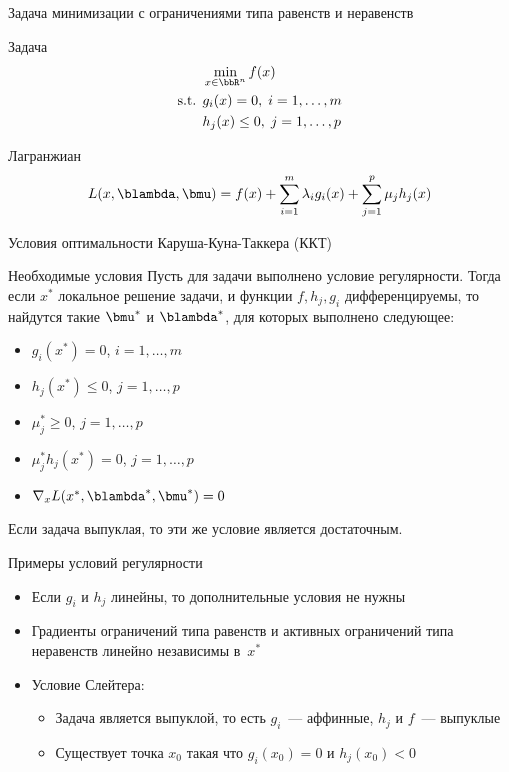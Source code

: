 \documentclass[12pt]{beamer}
\begin{document}
\begin{frame}{{\small Задача минимизации с ограничениями типа равенств и неравенств}}

\begin{block}{Задача}
\vspace{-5mm}
\begin{equation*}
\begin{split}
& \min\limits_{x \in \bbR^n} f(x)\\
\text{s.t. } & g_i(x) = 0, \; i = 1,\ldots,m\\
& h_j(x) \leq 0, \; j = 1,\ldots, p
\end{split}
\end{equation*}
\end{block}

\begin{block}{Лагранжиан}
\begin{equation*}
L(x, \blambda, \bmu) = f(x) + \sum\limits_{i=1}^m\lambda_i g_i(x) + \sum\limits_{j=1}^p \mu_j h_j(x)
\end{equation*}
\end{block}
\end{frame}

\begin{frame}{Условия оптимальности Каруша-Куна-Таккера (ККТ)}
\begin{block}{Необходимые условия}
Пусть для задачи выполнено условие регулярности. Тогда если $x^*$ локальное решение задачи, и функции $f, h_j, g_i$ дифференцируемы, то найдутся такие $\bmu^*$ и $\blambda^*$, для которых выполнено следующее:
\begin{itemize}
\item $g_i(x^*) = 0$, $i = 1,\ldots,m$
\item $h_j(x^*) \leq 0$, $j = 1,\ldots,p$
\item $ \mu^*_j \geq 0$, $j = 1,\ldots,p$
\item $\mu^*_jh_j(x^*) = 0$, $j = 1,\ldots,p$
\item $\nabla_x L(x^*, \blambda^*, \bmu^*) = 0$
\end{itemize}
\end{block}
Если задача выпуклая, то эти же условие является достаточным.
\end{frame}

\begin{frame}{Примеры условий регулярности}
\begin{itemize}
\item Если $g_i$ и $h_j$ линейны, то дополнительные условия не нужны
\item Градиенты ограничений типа равенств и активных ограничений типа неравенств линейно независимы в~$x^*$
\item Условие Слейтера:
\begin{itemize}
\item Задача является выпуклой, то есть $g_i$~--- аффинные, $h_j$ и $f$~--- выпуклые
\item Существует точка $x_0$ такая что $g_i(x_0) = 0$ и $h_j(x_0) < 0$
\end{itemize}

\end{itemize}
\end{frame}
\end{document}
